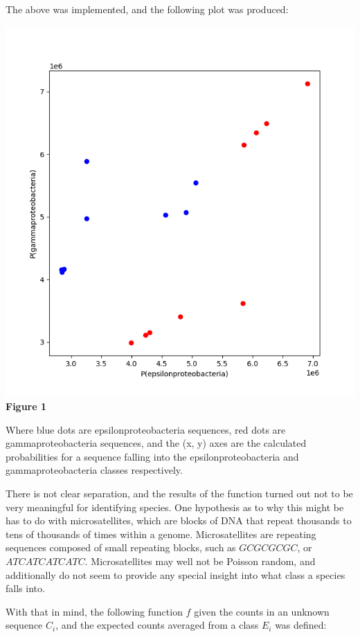 \documentclass[11pt, letterpaper, twocolumn]{article}
\begin{document}
   The above was implemented, and the following plot was produced:
   \begin{center}
   	\includegraphics[scale=0.5]{find-likely-class-test.png}
   	\small{\textbf{Figure 1}}
   \end{center}

	Where blue dots are epsilonproteobacteria sequences, red dots are gammaproteobacteria sequences, and the (x, y) axes are the calculated probabilities for a sequence falling into the epsilonproteobacteria and gammaproteobacteria classes respectively.
	
	There is not clear separation, and the results of the function turned out not to be very meaningful for identifying species. One hypothesis as to why this might be has to do with microsatellites, which are blocks of DNA that repeat thousands to tens of thousands of times within a genome. Microsatellites are repeating sequences composed of small repeating blocks, such as $GCGCGCGC$, or $ATCATCATCATC$. Microsatellites may well not be Poisson random, and additionally do not seem to provide any special insight into what class a species falls into.
	
	With that in mind, the following function $f$ given the counts in an unknown sequence $C_{i}$, and the expected counts averaged from a class $E_{i}$ was defined:
	
\end{document}
